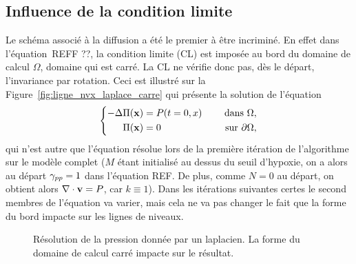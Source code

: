 \documentclass[main.tex]{subfiles}
\begin{document}
\subsection{Influence de la condition limite}
Le schéma associé à la diffusion a été le premier à être incriminé. En effet dans l'équation~REFF ??, la condition limite (CL) est imposée au bord du domaine de calcul $\Omega$, domaine qui est carré. La CL ne vérifie donc pas, dès le départ, l'invariance par rotation. Ceci est illustré sur la Figure~\ref{fig:ligne_nvx_laplace_carre} qui présente la solution de l'équation
\begin{equation}\label{eq:pression_iter1}
\left\{
\begin{aligned}
-\Delta \Pi(\mathbf{x}) &= P(t=0,x) & \quad \textrm{ dans }  \Omega , \\
\Pi(\mathbf{x}) &=0 & \quad \textrm{ sur  } \partial \Omega,
\end{aligned}
\right.
\end{equation}
qui n'est autre que l'équation résolue lors de la première itération de l'algorithme sur le modèle complet ($M$ étant initialisé au dessus du seuil d'hypoxie, on a alors au départ $\gamma_{pp}=1$ dans l'équation REF. De plus, comme $N=0$ au départ, on obtient alors $\nabla\cdot \mathbf{v} = P$, car $k\equiv1$). Dans les itérations suivantes certes le second membres de l'équation va varier, mais cela ne va pas changer le fait que la forme du bord impacte sur les lignes de niveaux.
\begin{figure}
\centering
{}
\caption{\label{fig:ligne_nvx_laplace} Résolution de la pression donnée par un laplacien. La forme du domaine de calcul carré impacte sur le résultat.}
\end{figure}
\end{document}
